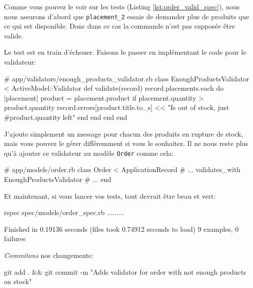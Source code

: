 \documentclass[]{report}
\begin{document}
    Comme vous pouvez le voir sur les tests (Listing \ref{lst:order_valid_spec}), nous nous assurons d'abord que \verb|placement_2| essaie de demander plus de produits que ce qui est disponible. Donc dans ce cas la commande n'est pas supposée être valide.

    Le test est en train d'échouer. Faisons le passer en implémentant le code pour le validateur:

    \begin{listing}
      \begin{rubycode}
      # app/validators/enough_products_validator.rb
      class EnoughProductsValidator < ActiveModel::Validator
        def validate(record)
          record.placements.each do |placement|
            product = placement.product
            if placement.quantity > product.quantity
              record.errors[product.title.to_s] << "Is out of stock, just #{product.quantity} left"
            end
          end
        end
      end
      \end{rubycode}
    \end{listing}

    J'ajoute simplement un message pour chacun des produits en rupture de stock, mais vous pouvez le gérer différemment si vous le souhaitez. Il ne nous reste plus qu'à ajouter ce validateur au modèle \verb|Order| comme cela:

    \begin{listing}
      \begin{rubycode}
      # app/models/order.rb
      class Order < ApplicationRecord
        # ...
        validates_with EnoughProductsValidator
        # ...
      end
      \end{rubycode}
    \end{listing}

    Et maintenant, si vous lancer vos tests, tout devrait être beau et vert:

    \begin{bashcode}
    rspec spec/models/order_spec.rb
    .........

    Finished in 0.19136 seconds (files took 0.74912 seconds to load)
    9 examples, 0 failures
    \end{bashcode}

    \textit{Commitons} nos changements:

    \begin{bashcode}
    git add . && git commit -m "Adds validator for order with not enough products on stock"
    \end{bashcode}
\end{document}
